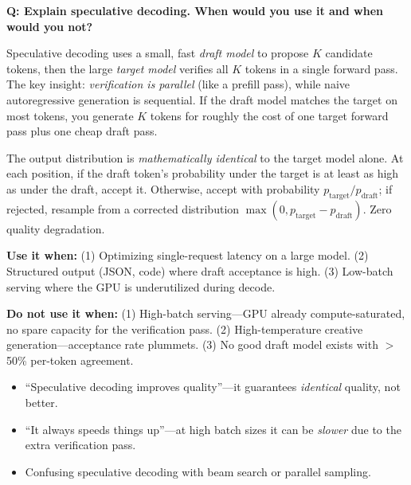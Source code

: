 \begin{interviewq}
\textbf{Q: Explain speculative decoding. When would you use it and when would you not?}

 \quad {} \quad \badgefreq{\freqhigh}

\stronganswer

Speculative decoding uses a small, fast \textit{draft model} to propose $K$ candidate tokens, then the large \textit{target model} verifies all $K$ tokens in a single forward pass. The key insight: \textit{verification is parallel} (like a prefill pass), while naive autoregressive generation is sequential. If the draft model matches the target on most tokens, you generate $K$ tokens for roughly the cost of one target forward pass plus one cheap draft pass.

The output distribution is \textit{mathematically identical} to the target model alone. At each position, if the draft token's probability under the target is at least as high as under the draft, accept it. Otherwise, accept with probability $p_{\text{target}} / p_{\text{draft}}$; if rejected, resample from a corrected distribution $\max(0, p_{\text{target}} - p_{\text{draft}})$. Zero quality degradation.

\textbf{Use it when:} (1) Optimizing single-request latency on a large model. (2) Structured output (JSON, code) where draft acceptance is high. (3) Low-batch serving where the GPU is underutilized during decode.

\textbf{Do not use it when:} (1) High-batch serving---GPU already compute-saturated, no spare capacity for the verification pass. (2) High-temperature creative generation---acceptance rate plummets. (3) No good draft model exists with $>$50\% per-token agreement.

\redflags
\begin{itemize}
    \item ``Speculative decoding improves quality''---it guarantees \textit{identical} quality, not better.
    \item ``It always speeds things up''---at high batch sizes it can be \textit{slower} due to the extra verification pass.
    \item Confusing speculative decoding with beam search or parallel sampling.
\end{itemize}



\end{interviewq}
